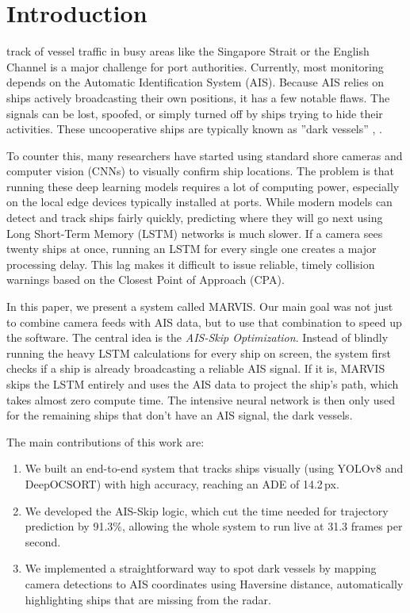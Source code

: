 \documentclass{ieeeaccess}
\begin{document}
\titlepgskip=-15pt

\maketitle

\section{Introduction}

\label{sec:intro}

 track of vessel traffic in busy areas like the Singapore Strait or the English Channel is a major challenge for port authorities. Currently, most monitoring depends on the Automatic Identification System (AIS). Because AIS relies on ships actively broadcasting their own positions, it has a few notable flaws. The signals can be lost, spoofed, or simply turned off by ships trying to hide their activities. These uncooperative ships are typically known as ''dark vessels'' \cite{b2}, \cite{b4}.

To counter this, many researchers have started using standard shore cameras and computer vision (CNNs) to visually confirm ship locations. The problem is that running these deep learning models requires a lot of computing power, especially on the local edge devices typically installed at ports. While modern models can detect and track ships fairly quickly, predicting where they will go next using Long Short-Term Memory (LSTM) networks is much slower. If a camera sees twenty ships at once, running an LSTM for every single one creates a major processing delay. This lag makes it difficult to issue reliable, timely collision warnings based on the Closest Point of Approach (CPA).

In this paper, we present a system called MARVIS. Our main goal was not just to combine camera feeds with AIS data, but to use that combination to speed up the software. The central idea is the \textit{AIS-Skip Optimization}. Instead of blindly running the heavy LSTM calculations for every ship on screen, the system first checks if a ship is already broadcasting a reliable AIS signal. If it is, MARVIS skips the LSTM entirely and uses the AIS data to project the ship's path, which takes almost zero compute time. The intensive neural network is then only used for the remaining ships that don't have an AIS signal, the dark vessels.

The main contributions of this work are:
\begin{enumerate}
    \item We built an end-to-end system that tracks ships visually (using YOLOv8 and DeepOCSORT) with high accuracy, reaching an ADE of 14.2\,px.
    \item We developed the AIS-Skip logic, which cut the time needed for trajectory prediction by 91.3\%, allowing the whole system to run live at 31.3 frames per second.
    \item We implemented a straightforward way to spot dark vessels by mapping camera detections to AIS coordinates using Haversine distance, automatically highlighting ships that are missing from the radar.
\end{enumerate}
\end{document}
